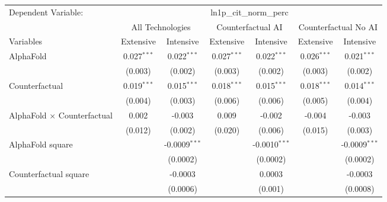 \begingroup
\centering
\begin{tabular}{lcccccc}
   \tabularnewline \midrule \midrule
   Dependent Variable: & \multicolumn{6}{c}{ln1p\_cit\_norm\_perc}\\
 & \multicolumn{2}{c}{All Technologies} & \multicolumn{2}{c}{Counterfactual AI} & \multicolumn{2}{c}{Counterfactual No AI} \\
\cmidrule(lr){1-1}\cmidrule(lr){2-3} \cmidrule(lr){4-5} \cmidrule(lr){6-7}
Variables & \multicolumn{1}{c}{Extensive} & \multicolumn{1}{c}{Intensive} & \multicolumn{1}{c}{Extensive} & \multicolumn{1}{c}{Intensive} & \multicolumn{1}{c}{Extensive} & \multicolumn{1}{c}{Intensive} \\
\cmidrule(lr){1-1}\cmidrule(lr){2-2} \cmidrule(lr){3-3} \cmidrule(lr){4-4} \cmidrule(lr){5-5} \cmidrule(lr){6-6} \cmidrule(lr){7-7}
   AlphaFold                          & 0.027$^{***}$ & 0.022$^{***}$   & 0.027$^{***}$ & 0.022$^{***}$   & 0.026$^{***}$ & 0.021$^{***}$\\   
                                      & (0.003)       & (0.002)         & (0.003)       & (0.002)         & (0.003)       & (0.002)\\   
   Counterfactual                     & 0.019$^{***}$ & 0.015$^{***}$   & 0.018$^{***}$ & 0.015$^{***}$   & 0.018$^{***}$ & 0.014$^{***}$\\   
                                      & (0.004)       & (0.003)         & (0.006)       & (0.006)         & (0.005)       & (0.004)\\   
   AlphaFold $\times$ Counterfactual  & 0.002         & -0.003          & 0.009         & -0.002          & -0.004        & -0.003\\   
                                      & (0.012)       & (0.002)         & (0.020)       & (0.006)         & (0.015)       & (0.003)\\   
   AlphaFold square                   &               & -0.0009$^{***}$ &               & -0.0010$^{***}$ &               & -0.0009$^{***}$\\   
                                      &               & (0.0002)        &               & (0.0002)        &               & (0.0002)\\   
   Counterfactual square              &               & -0.0003         &               & 0.0003          &               & -0.0003\\   
                                      &               & (0.0006)        &               & (0.001)         &               & (0.0008)\\   

\end{tabular}
